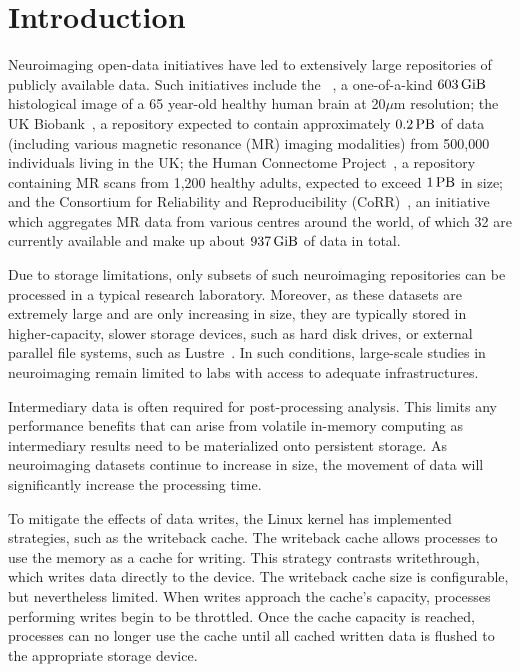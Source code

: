 \section{Introduction}
Neuroimaging open-data initiatives have led to extensively large repositories of
publicly available data. Such initiatives include the
\bigbrain~\cite{amunts2013bigbrain}, a one-of-a-kind $\SI{603}{\gibi\byte}$
histological image of a 65 year-old healthy human brain at 20$\mu$m resolution;
the UK Biobank~\cite{ukbiobank}, a repository expected to contain approximately
$\SI{0.2}{\peta\byte}$ of data (including various magnetic resonance (MR)
imaging modalities) from 500,000 individuals living in the UK; the Human
Connectome Project~\cite{HCP}, a repository containing MR scans from 1,200
healthy adults, expected to exceed $\SI{1}{\peta\byte}$ in size; and the
Consortium for Reliability and Reproducibility (CoRR)~\cite{corr}, an initiative
which aggregates MR data from various centres around the world, of which 32 are
currently available and make up about $\SI{937}{\gibi\byte}$ of data in total.

Due to storage limitations, only subsets of such neuroimaging repositories can
be processed in a typical research laboratory. Moreover, as these datasets are
extremely large and are only increasing in size, they are typically stored in
higher-capacity, slower storage devices, such as hard disk drives, or external
parallel file systems, such as Lustre~\cite{lustre}. In such conditions,
large-scale studies in neuroimaging remain limited to labs with access to
adequate infrastructures.

Intermediary data is often required for post-processing analysis. This limits
any performance benefits that can arise from volatile in-memory computing as
intermediary results need to be materialized onto persistent storage. As
neuroimaging datasets continue to increase in size, the movement of data will
significantly increase the processing time.

To mitigate the effects of data writes, the Linux kernel has implemented
strategies, such as the writeback cache. The writeback cache allows processes to
use the memory as a cache for writing. This strategy contrasts writethrough,
which writes data directly to the device. The writeback cache size is
configurable, but nevertheless limited. When writes approach the cache's
capacity, processes performing writes begin to be throttled. Once the cache
capacity is reached, processes can no longer use the cache until all cached
written data is flushed to the appropriate storage device.

